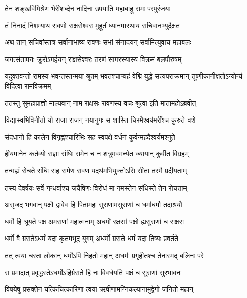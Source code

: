 
\twolineshloka
{तेन शङ्खविमिश्रेण भेरीशब्देन नादिना}
{उपयाति महाबाहू रामः परपुरंजयः} %

\twolineshloka
{तं निनादं निशम्याथ रावणो राक्षसेश्वरः}
{मुहूर्तं ध्यानमास्थाय सचिवानभ्युदैक्षत} %

\twolineshloka
{अथ तान् सचिवांस्तत्र सर्वानाभाष्य रावणः}
{सभां संनादयन् सर्वामित्युवाच महाबलः} %

\twolineshloka
{जगत्संतापनः क्रूरोऽगर्हयन् राक्षसेश्वरः}
{तरणं सागरस्यास्य विक्रमं बलपौरुषम्} %

\threelineshloka
{यदुक्तवन्तो रामस्य भवन्तस्तन्मया श्रुतम्}
{भवतश्चाप्यहं वेद्मि युद्धे सत्यपराक्रमान्}
{तूष्णीकानीक्षतोऽन्योन्यं विदित्वा रामविक्रमम्} %

\twolineshloka
{ततस्तु सुमहाप्राज्ञो माल्यवान् नाम राक्षसः}
{रावणस्य वचः श्रुत्वा इति मातामहोऽब्रवीत्} %

\twolineshloka
{विद्यास्वभिविनीतो यो राजा राजन् नयानुगः}
{स शास्ति चिरमैश्वर्यमरींश्च कुरुते वशे} %

\twolineshloka
{संदधानो हि कालेन विगृह्णंश्चारिभिः सह}
{स्वपक्षे वर्धनं कुर्वन्महदैश्वर्यमश्नुते} %

\twolineshloka
{हीयमानेन कर्तव्यो राज्ञा संधिः समेन च}
{न शत्रुमवमन्येत ज्यायान् कुर्वीत विग्रहम्} %

\twolineshloka
{तन्मह्यं रोचते संधिः सह रामेण रावण}
{यदर्थमभियुक्तोऽसि सीता तस्मै प्रदीयताम्} %

\twolineshloka
{तस्य देवर्षयः सर्वे गन्धर्वाश्च जयैषिणः}
{विरोधं मा गमस्तेन संधिस्ते तेन रोचताम्} %

\twolineshloka
{असृजद् भगवान् पक्षौ द्वावेव हि पितामहः}
{सुराणामसुराणां च धर्माधर्मौ तदाश्रयौ} %

\twolineshloka
{धर्मो हि श्रूयते पक्ष अमराणां महात्मनाम्}
{अधर्मो रक्षसां पक्षो ह्यसुराणां च राक्षस} %

\twolineshloka
{धर्मो वै ग्रसतेऽधर्मं यदा कृतमभूद् युगम्}
{अधर्मो ग्रसते धर्मं यदा तिष्यः प्रवर्तते} %

\twolineshloka
{तत् त्वया चरता लोकान् धर्मोऽपि निहतो महान्}
{अधर्मः प्रगृहीतश्च तेनास्मद् बलिनः परे} %

\twolineshloka
{स प्रमादात् प्रवृद्धस्तेऽधर्मोऽहिर्ग्रसते हि नः}
{विवर्धयति पक्षं च सुराणां सुरभावनः} %

\twolineshloka
{विषयेषु प्रसक्तेन यत्किंचित्कारिणा त्वया}
{ऋषीणामग्निकल्पानामुद्वेगो जनितो महान्} %

